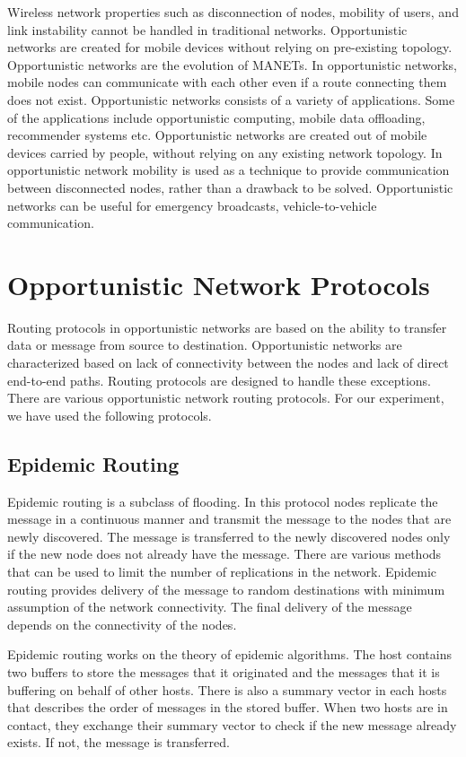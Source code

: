 \documentclass[conference]{IEEEtran}
\begin{document}
Wireless network properties such as disconnection of nodes, mobility of users, and link instability cannot be handled in traditional networks. Opportunistic networks are created for mobile devices without relying on pre-existing topology. Opportunistic networks are the evolution of MANETs. In opportunistic networks, mobile nodes can communicate with each other even if a route connecting them does not exist. Opportunistic networks consists of a variety of applications. Some of the applications include opportunistic computing, mobile data offloading, recommender systems etc. Opportunistic networks are created out of mobile devices carried by people, without relying on any existing network topology. In opportunistic network mobility is used as a technique to provide communication between disconnected nodes, rather than a drawback to be solved. Opportunistic networks can be useful for emergency broadcasts, vehicle-to-vehicle communication.



\section{Opportunistic Network Protocols}
Routing protocols in opportunistic networks are based on the ability to transfer data or message from source to destination. Opportunistic networks are characterized based on lack of connectivity between the nodes and lack of direct end-to-end paths. Routing protocols are designed to handle these exceptions. There are various opportunistic network routing protocols. For our experiment, we have used the following protocols.

\subsection{Epidemic Routing}  
Epidemic routing \cite{epidemic} is a subclass of flooding. In this protocol nodes replicate the message in a continuous manner and transmit the message to the nodes that are newly discovered. The message is transferred to the newly discovered nodes only if the new node does not already have the message. There are various methods that can be used to limit the number of replications in the network. Epidemic routing provides delivery of the message to random destinations with minimum assumption of the network connectivity. The final delivery of the message depends on the connectivity of the nodes.

Epidemic routing works on the theory of epidemic algorithms. The host contains two buffers to store the messages that it originated and the messages that it is buffering on behalf of other hosts. There is also a summary vector in each hosts that describes the order of messages in the stored buffer. When two hosts are in contact, they exchange their summary vector to check if the new message already exists. If not, the message is transferred. 
\end{document}
